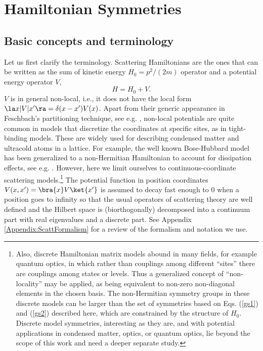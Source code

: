 
\section{Hamiltonian Symmetries}
\label{sec:SymTheory}
%
\subsection{Basic concepts and terminology}
%
Let us first clarify the terminology. Scattering Hamiltonians are the ones that can be written as the sum of kinetic energy $H_0 = {p^2}/({2m})$ operator and a potential energy operator $V$,
%
\begin{equation}
	H = H_0 + V.
	\label{eq:ScatteringHamiltonian}
\end{equation}
%
$V$ is in general non-local, i.e., it does not have the local form $\la x|V|x'\ra=\delta(x-x')V(x)$.
Apart from their generic appearance in Feschbach's partitioning technique, see e.g. \cite{Ruschhaupt2004a},
non-local potentials   are quite common in models that discretize the coordinates at specific sites, as in tight-binding models.
These are widely used for describing condensed matter and ultracold atoms in a lattice. For example, the well known Bose-Hubbard model has been generalized to a non-Hermitian Hamiltonian to account for dissipation effects, see e.g. \cite{Hiller2006,Zhong2011}. However, here we limit ourselves to continuous-coordinate scattering models.\footnote{
Also, discrete Hamiltonian matrix models abound in many fields, for example quantum optics, in which rather than couplings
among different ``sites'' there are couplings among states or levels.
Thus a generalized concept of ``non-locality'' may be applied,
as being equivalent to non-zero non-diagonal elements in the chosen basis. The non-Hermitian symmetry groups in these discrete models
can be larger than the set of symmetries based on Eqs. (\ref{gs1}) and (\ref{gs2}) described here, which are constrained by the structure of $H_0$. Discrete model symmetries, interesting as they are, and
with potential applications in condensed matter, optics, or quantum optics,
lie beyond the scope of this work and need a deeper separate study.}
The potential function in position coordinates $V(x,x') = \bra{x}V\ket{x'}$ is assumed to decay fast enough to 0 when a position goes to infinity so that the usual operators of scattering theory are well defined and the Hilbert space is (biorthogonally) decomposed into a continuum
part with real eigenvalues and a discrete part. See Appendix \ref{Appendix:ScattFormalism} for a review of the formalism and notation we use.

